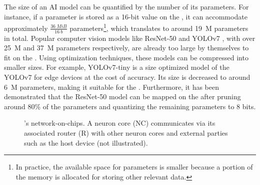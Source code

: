 The size of an AI model can be quantified by the number of its parameters.
For instance, if a parameter is stored as a 16-bit value on the \graicore{}, it can accommodate approximately $\frac{\SI{36}{MiB}}{\SI{16}{b}}$ parameters\footnote{In practice, the available space for parameters is smaller because a portion of the memory is allocated for storing other relevant data.}, which translates to around \SI{19}{M} parameters in total.
Popular computer vision models like ResNet-50 \cite{heDeepResidualLearning2015} and YOLOv7 \cite{wangYOLOv7TrainableBagoffreebies2022}, with over \SI{25}{M} and \SI{37}{M} parameters respectively, are already too large by themselves to fit on the \graicore{}.
Using optimization techniques, these models can be compressed into smaller sizes.
For example, YOLOv7-tiny \cite{wangYOLOv7TrainableBagoffreebies2022} is a size optimized model of the YOLOv7 for edge devices at the cost of accuracy.
Its size is decreased to around \SI{6}{M} parameters, making it suitable for the \graicore{}.
Furthermore, it has been demonstrated that the ResNet-50 model can be mapped on the \graicore{} after pruning around 80\% of the parameters and quantizing the remaining parameters to 8 bits.

\begin{figure}[htbp]
    \centering
    \hfill
    \caption{\graicore{}'s network-on-chips. A neuron core (NC) communicates via its associated router (R) with other neuron cores and external parties such as the host device (not illustrated).}
    \label{fig:noc}
\end{figure}

